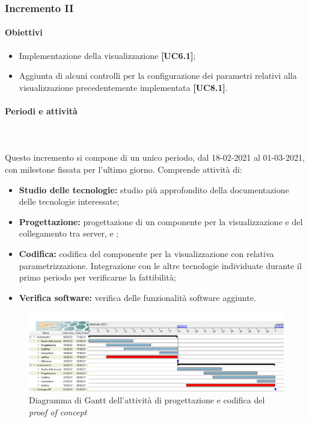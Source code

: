 \subsubsection{Incremento II}  
\paragraph{Obiettivi}
\begin{itemize}
\item Implementazione della visualizzazione  \textbf{[UC6.1]};
\item Aggiunta di alcuni controlli per la configurazione dei parametri relativi alla visualizzazione precedentemente implementata  \textbf{[UC8.1]}. 
\end{itemize}			
	
\paragraph{Periodi e attività} \mbox{}\\\mbox{}\\
Questo incremento si compone di un unico periodo, dal 18-02-2021 al 01-03-2021, con milestone fissata per l'ultimo giorno. Comprende attività di:
\begin{itemize}
\item \textbf{Studio delle tecnologie:} studio più approfondito della documentazione delle tecnologie interessate;
\item \textbf{Progettazione:} progettazione di un componente per la visualizzazione  e del collegamento tra server,  e ;
\item \textbf{Codifica:} codifica del componente per la visualizzazione con relativa parametrizzazione. Integrazione con le altre tecnologie individuate durante il primo periodo per verificarne la fattibilità;
\item \textbf{Verifica software:} verifica delle funzionalità software aggiunte.
\end{itemize}

\begin{figure}[h]
	\centering	
	\includegraphics[width=\linewidth]{Images/GanttPianificazioneProgettazionePoc.PNG}
	\caption{Diagramma di Gantt dell'attività di progettazione e codifica del \textit{proof of concept}}
\end{figure}




